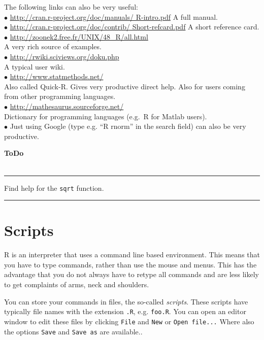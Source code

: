 \documentclass[a4paper,11pt,twocolumn,tablecaptionabove]{scrartcl} %
\makeatletter
\newenvironment{ToDo} {%
  \begin{flushright}
    \hfill
    \begin{minipage}{0.95\columnwidth}         %
    \textsf{\textbf{ToDo}} \\
      \vspace{-0.85cm}\\
      {\color{Gray}\rule[-0.1cm]{\columnwidth}{1.5pt}}} { %
      {\color{Gray} \rule[0.3cm]{\columnwidth}{1.5pt}}
    \end{minipage}
    \vspace{1em}
  \end{flushright}
  }
\let\SF@@footnote\footnote
\def\footnote{\ifx\protect\@typeset@protect
 \expandafter\SF@@footnote
 \else
 \expandafter\SF@gobble@opt
 \fi
}
\edef\SF@gobble@opt{\noexpand\protect
 \expandafter\noexpand\csname SF@gobble@opt \endcsname}
\makeatother
\begin{document}
The following links can also be very useful:\\
\noindent $\bullet$ \url{http://cran.r-project.org/doc/manuals/ R-intro.pdf} A full manual.\\
\noindent $\bullet$ \url{http://cran.r-project.org/doc/contrib/ Short-refcard.pdf} A short reference card.\\
\noindent $\bullet$  \url{http://zoonek2.free.fr/UNIX/48\_R/all.html}\\
  A very rich source of examples.\\
\noindent $\bullet$  \url{http://rwiki.sciviews.org/doku.php}\\
  A typical user wiki.\\
\noindent $\bullet$ \url{http://www.statmethods.net/}\\
    Also called Quick-R. Gives very productive direct help. Also for users coming from other programming languages. \\
    \noindent $\bullet$ \url{http://mathesaurus.sourceforge.net/}\\
    Dictionary for programming languages (e.g.~R for Matlab users). \\
\noindent $\bullet$  Just using Google (type e.g. ``R rnorm'' in the search field) can also be very
productive.\\

\begin{ToDo}
Find help for the \texttt{sqrt} function.\\
\end{ToDo}


\section{Scripts}

R is an interpreter that uses a command line based environment. This means that you have to type
commands, rather than use the mouse and menus.  
This has the advantage that you do not always have to retype all commands and are less likely to get complaints of arms, neck and shoulders.

You can store your commands in files, the so-called \emph{scripts}.  
These scripts have typically file names with the extension
\texttt{.R}, e.g.  \texttt{foo.R}.  
You can open an editor window to edit these
files by clicking \texttt{File} and \texttt{New} or \texttt{Open file...}
\footnote{Where also the options \texttt{Save} and
  \texttt{Save as} are available.}.
\end{document}
